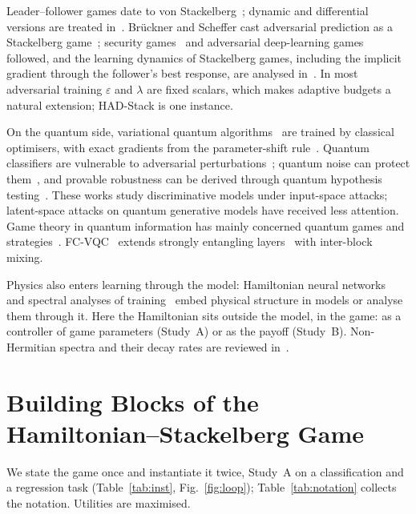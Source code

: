 \documentclass[conference]{IEEEtran}
\begin{document}
Leader--follower games date to von Stackelberg~\cite{stackelberg1934}; dynamic and differential versions are treated in~\cite{isaacs1965,basar1999}. Br\"uckner and Scheffer cast adversarial prediction as a Stackelberg game~\cite{bruckner2011}; security games~\cite{tambe2011} and adversarial deep-learning games~\cite{chivukula2017,chivukula2019,chivukula2021} followed, and the learning dynamics of Stackelberg games, including the implicit gradient through the follower's best response, are analysed in~\cite{fiez2020}. In most adversarial training $\varepsilon$ and $\lambda$ are fixed scalars, which makes adaptive budgets a natural extension; HAD-Stack is one instance.

On the quantum side, variational quantum algorithms~\cite{peruzzo2014,mcardle2020,cerezo2021} are trained by classical optimisers, with exact gradients from the parameter-shift rule~\cite{mitarai2018,schuld2019}. Quantum classifiers are vulnerable to adversarial perturbations~\cite{liu2020vuln,lu2020qaml}; quantum noise can protect them~\cite{du2021}, and provable robustness can be derived through quantum hypothesis testing~\cite{weber2021}. These works study discriminative models under input-space attacks; latent-space attacks on quantum generative models have received less attention. Game theory in quantum information has mainly concerned quantum games and strategies~\cite{eisert1999}. FC-VQC~\cite{su2026} extends strongly entangling layers~\cite{schuld2020} with inter-block mixing.

Physics also enters learning through the model: Hamiltonian neural networks~\cite{greydanus2019,mattheakis2022} and spectral analyses of training~\cite{ghorbani2019} embed physical structure in models or analyse them through it. Here the Hamiltonian sits outside the model, in the game: as a controller of game parameters (Study~A) or as the payoff (Study~B). Non-Hermitian spectra and their decay rates are reviewed in~\cite{ashida2020}.

\section{Building Blocks of the Hamiltonian--Stackelberg Game}\label{sec:game}
We state the game once and instantiate it twice, Study~A on a classification and a regression task (Table~\ref{tab:inst}, Fig.~\ref{fig:loop}); Table~\ref{tab:notation} collects the notation. Utilities are maximised.
\end{document}
